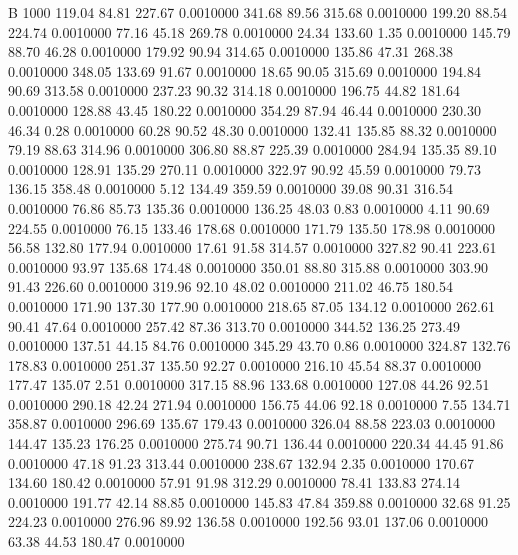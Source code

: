 


B 1000
 119.04   84.81  227.67   0.0010000
 341.68   89.56  315.68   0.0010000
 199.20   88.54  224.74   0.0010000
  77.16   45.18  269.78   0.0010000
  24.34  133.60    1.35   0.0010000
 145.79   88.70   46.28   0.0010000
 179.92   90.94  314.65   0.0010000
 135.86   47.31  268.38   0.0010000
 348.05  133.69   91.67   0.0010000
  18.65   90.05  315.69   0.0010000
 194.84   90.69  313.58   0.0010000
 237.23   90.32  314.18   0.0010000
 196.75   44.82  181.64   0.0010000
 128.88   43.45  180.22   0.0010000
 354.29   87.94   46.44   0.0010000
 230.30   46.34    0.28   0.0010000
  60.28   90.52   48.30   0.0010000
 132.41  135.85   88.32   0.0010000
  79.19   88.63  314.96   0.0010000
 306.80   88.87  225.39   0.0010000
 284.94  135.35   89.10   0.0010000
 128.91  135.29  270.11   0.0010000
 322.97   90.92   45.59   0.0010000
  79.73  136.15  358.48   0.0010000
   5.12  134.49  359.59   0.0010000
  39.08   90.31  316.54   0.0010000
  76.86   85.73  135.36   0.0010000
 136.25   48.03    0.83   0.0010000
   4.11   90.69  224.55   0.0010000
  76.15  133.46  178.68   0.0010000
 171.79  135.50  178.98   0.0010000
  56.58  132.80  177.94   0.0010000
  17.61   91.58  314.57   0.0010000
 327.82   90.41  223.61   0.0010000
  93.97  135.68  174.48   0.0010000
 350.01   88.80  315.88   0.0010000
 303.90   91.43  226.60   0.0010000
 319.96   92.10   48.02   0.0010000
 211.02   46.75  180.54   0.0010000
 171.90  137.30  177.90   0.0010000
 218.65   87.05  134.12   0.0010000
 262.61   90.41   47.64   0.0010000
 257.42   87.36  313.70   0.0010000
 344.52  136.25  273.49   0.0010000
 137.51   44.15   84.76   0.0010000
 345.29   43.70    0.86   0.0010000
 324.87  132.76  178.83   0.0010000
 251.37  135.50   92.27   0.0010000
 216.10   45.54   88.37   0.0010000
 177.47  135.07    2.51   0.0010000
 317.15   88.96  133.68   0.0010000
 127.08   44.26   92.51   0.0010000
 290.18   42.24  271.94   0.0010000
 156.75   44.06   92.18   0.0010000
   7.55  134.71  358.87   0.0010000
 296.69  135.67  179.43   0.0010000
 326.04   88.58  223.03   0.0010000
 144.47  135.23  176.25   0.0010000
 275.74   90.71  136.44   0.0010000
 220.34   44.45   91.86   0.0010000
  47.18   91.23  313.44   0.0010000
 238.67  132.94    2.35   0.0010000
 170.67  134.60  180.42   0.0010000
  57.91   91.98  312.29   0.0010000
  78.41  133.83  274.14   0.0010000
 191.77   42.14   88.85   0.0010000
 145.83   47.84  359.88   0.0010000
  32.68   91.25  224.23   0.0010000
 276.96   89.92  136.58   0.0010000
 192.56   93.01  137.06   0.0010000
  63.38   44.53  180.47   0.0010000
